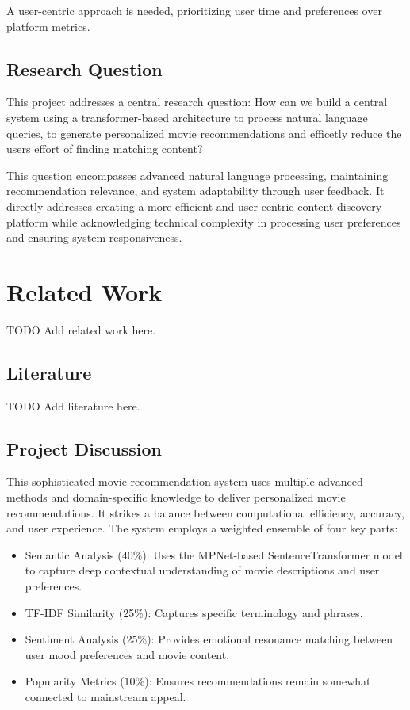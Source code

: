 \documentclass[12pt,a4paper]{article}
\begin{document}
  \noindent A user-centric approach is needed, prioritizing user time and preferences over platform metrics.

  \subsection{Research Question}

  This project addresses a central research question:
  How can we build a central system using a transformer-based architecture to process natural language queries,
  to generate personalized movie recommendations and efficetly reduce the users effort of finding matching content?

  \noindent This question encompasses advanced natural language processing, maintaining recommendation relevance, and system
  adaptability through user feedback. It directly addresses creating a more efficient and user-centric content discovery
  platform while acknowledging technical complexity in processing user preferences and ensuring system responsiveness.


  \section{Related Work}

  TODO Add related work here.

  \subsection{Literature}

  TODO Add literature here.

  \subsection{Project Discussion}

  This sophisticated movie recommendation system uses multiple advanced methods and domain-specific knowledge
  to deliver personalized movie recommendations. It strikes a balance between computational efficiency, accuracy, and
  user experience.
  The system employs a weighted ensemble of four key parts:
  \begin{itemize}
    \item Semantic Analysis (40\%): Uses the MPNet-based SentenceTransformer model to capture deep contextual understanding of movie descriptions and user preferences.
    \item TF-IDF Similarity (25\%): Captures specific terminology and phrases.
    \item Sentiment Analysis (25\%): Provides emotional resonance matching between user mood preferences and movie content.
    \item Popularity Metrics (10\%): Ensures recommendations remain somewhat connected to mainstream appeal.
  \end{itemize}
\end{document}
